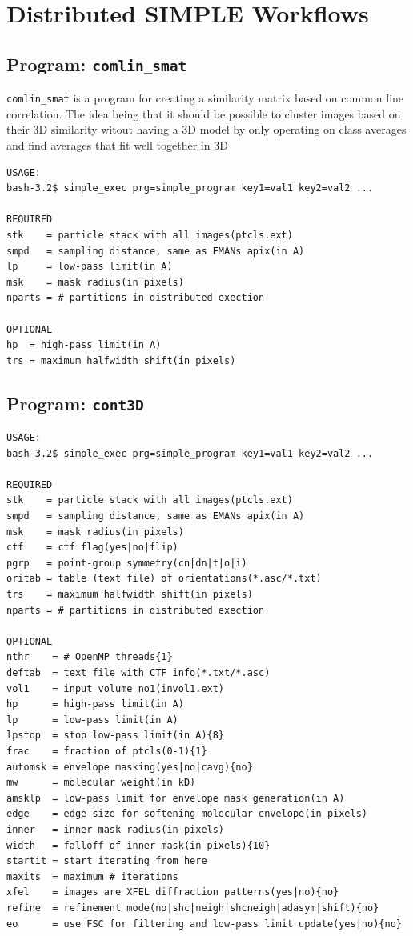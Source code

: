 \documentclass[a4paper,11pt]{article}
\newcommand{\prgname}[1]{\textcolor{NavyBlue}{\texttt{#1}}}
\begin{document}
\section{Distributed SIMPLE Workflows}
\subsection{Program: \prgname{comlin\_smat}}
\label{comlin_smat}
\prgname{comlin\_smat} is a program for creating a similarity matrix based on common line correlation. The idea being that it should be possible to cluster images based on their 3D similarity witout having a 3D model by only operating on class averages and find averages that fit well together in 3D

\begin{verbatim}
USAGE:
bash-3.2$ simple_exec prg=simple_program key1=val1 key2=val2 ...

REQUIRED
stk    = particle stack with all images(ptcls.ext)
smpd   = sampling distance, same as EMANs apix(in A)
lp     = low-pass limit(in A)
msk    = mask radius(in pixels)
nparts = # partitions in distributed exection

OPTIONAL
hp  = high-pass limit(in A)
trs = maximum halfwidth shift(in pixels)
\end{verbatim}

\subsection{Program: \prgname{cont3D}}
\label{cont3D}
\begin{verbatim}
USAGE:
bash-3.2$ simple_exec prg=simple_program key1=val1 key2=val2 ...

REQUIRED
stk    = particle stack with all images(ptcls.ext)
smpd   = sampling distance, same as EMANs apix(in A)
msk    = mask radius(in pixels)
ctf    = ctf flag(yes|no|flip)
pgrp   = point-group symmetry(cn|dn|t|o|i)
oritab = table (text file) of orientations(*.asc/*.txt)
trs    = maximum halfwidth shift(in pixels)
nparts = # partitions in distributed exection

OPTIONAL
nthr    = # OpenMP threads{1}
deftab  = text file with CTF info(*.txt/*.asc)
vol1    = input volume no1(invol1.ext)
hp      = high-pass limit(in A)
lp      = low-pass limit(in A)
lpstop  = stop low-pass limit(in A){8}
frac    = fraction of ptcls(0-1){1}
automsk = envelope masking(yes|no|cavg){no}
mw      = molecular weight(in kD)
amsklp  = low-pass limit for envelope mask generation(in A)
edge    = edge size for softening molecular envelope(in pixels)
inner   = inner mask radius(in pixels)
width   = falloff of inner mask(in pixels){10}
startit = start iterating from here
maxits  = maximum # iterations
xfel    = images are XFEL diffraction patterns(yes|no){no}
refine  = refinement mode(no|shc|neigh|shcneigh|adasym|shift){no}
eo      = use FSC for filtering and low-pass limit update(yes|no){no}
\end{verbatim}
\end{document}
